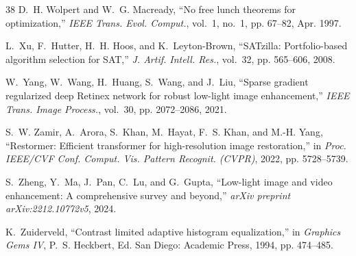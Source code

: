 \documentclass[journal]{IEEEtran}
\begin{document}
\begin{thebibliography}{38}
D.~H. Wolpert and W.~G. Macready, ``No free lunch theorems for optimization,'' \emph{IEEE Trans. Evol. Comput.}, vol.~1, no.~1, pp. 67--82, Apr. 1997.

L.~Xu, F.~Hutter, H.~H. Hoos, and K.~Leyton-Brown, ``SATzilla: Portfolio-based algorithm selection for SAT,'' \emph{J. Artif. Intell. Res.}, vol.~32, pp. 565--606, 2008.

W.~Yang, W.~Wang, H.~Huang, S.~Wang, and J.~Liu, ``Sparse gradient regularized deep Retinex network for robust low-light image enhancement,'' \emph{IEEE Trans. Image Process.}, vol.~30, pp. 2072--2086, 2021.

S.~W. Zamir, A.~Arora, S.~Khan, M.~Hayat, F.~S. Khan, and M.-H. Yang, ``Restormer: Efficient transformer for high-resolution image restoration,'' in \emph{Proc. IEEE/CVF Conf. Comput. Vis. Pattern Recognit. (CVPR)}, 2022, pp. 5728--5739.

S.~Zheng, Y.~Ma, J.~Pan, C.~Lu, and G.~Gupta, ``Low-light image and video enhancement: A comprehensive survey and beyond,'' \emph{arXiv preprint arXiv:2212.10772v5}, 2024.

K.~Zuiderveld, ``Contrast limited adaptive histogram equalization,'' in \emph{Graphics Gems IV}, P.~S. Heckbert, Ed. San Diego: Academic Press, 1994, pp. 474--485.

\end{thebibliography}
\end{document}
